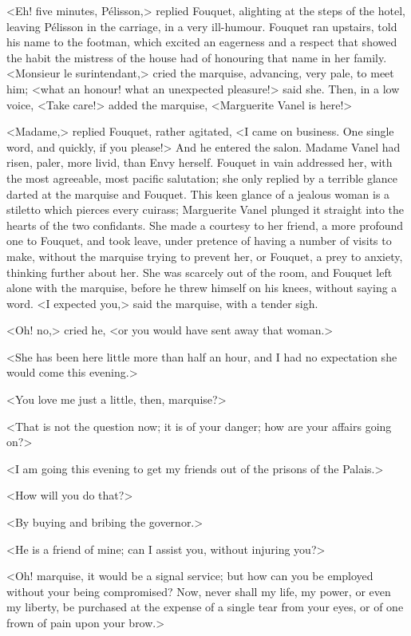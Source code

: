 <Eh! five minutes, Pélisson,> replied Fouquet, alighting at the steps of the hotel, leaving Pélisson in the carriage, in a very ill-humour. Fouquet ran upstairs, told his name to the footman, which excited an eagerness and a respect that showed the habit the mistress of the house had of honouring that name in her family. <Monsieur le surintendant,> cried the marquise, advancing, very pale, to meet him; <what an honour! what an unexpected pleasure!> said she. Then, in a low voice, <Take care!> added the marquise, <Marguerite Vanel is here!>

<Madame,> replied Fouquet, rather agitated, <I came on business. One single word, and quickly, if you please!> And he entered the salon. Madame Vanel had risen, paler, more livid, than Envy herself. Fouquet in vain addressed her, with the most agreeable, most pacific salutation; she only replied by a terrible glance darted at the marquise and Fouquet. This keen glance of a jealous woman is a stiletto which pierces every cuirass; Marguerite Vanel plunged it straight into the hearts of the two confidants. She made a courtesy to her friend, a more profound one to Fouquet, and took leave, under pretence of having a number of visits to make, without the marquise trying to prevent her, or Fouquet, a prey to anxiety, thinking further about her. She was scarcely out of the room, and Fouquet left alone with the marquise, before he threw himself on his knees, without saying a word. <I expected you,> said the marquise, with a tender sigh.

<Oh! no,> cried he, <or you would have sent away that woman.>

<She has been here little more than half an hour, and I had no expectation she would come this evening.>

<You love me just a little, then, marquise?>

<That is not the question now; it is of your danger; how are your affairs going on?>

<I am going this evening to get my friends out of the prisons of the Palais.>

<How will you do that?>

<By buying and bribing the governor.>

<He is a friend of mine; can I assist you, without injuring you?>

<Oh! marquise, it would be a signal service; but how can you be employed without your being compromised? Now, never shall my life, my power, or even my liberty, be purchased at the expense of a single tear from your eyes, or of one frown of pain upon your brow.>

